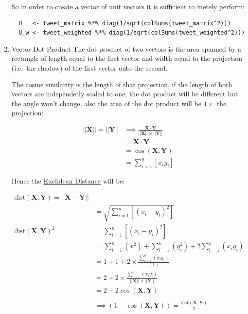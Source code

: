 \documentclass[11pt]{article}
\begin{document}
\begin{enumerate}
So in order to create a vector of unit vectors it is sufficient to
merely perform:

\begin{verbatim}
  U   <- tweet_matrix %*% diag(1/sqrt(colSums(tweet_matrix^2)))
  U_w <- tweet_weighted %*% diag(1/sqrt(colSums(tweet_weighted^2)))
\end{verbatim}

\item Vector Dot Product
\label{sec:org70ac74d}
The dot product of two vectors is the area spanned by a rectangle of
length equal to the first vector and width equal to the projection
(i.e. the shadow) of the first vector onto the second.

The cosine similarity is the length of that projection, if the length of
both vectors are independetly scaled to one, the dot product will be
different but the angle won't change, also the area of the dot product
will be \(1 \times\) the projection:

$$\begin{aligned}
    \left| \left| \mathbf{X} \right| \right| = \left|  \left| \mathbf{Y} \right| \right|  &\implies   \frac{\mathbf{\mathbf{X}\cdot  \mathbf{Y}}}{\left| \left| \mathbf{X} \right| \right|\times \left| \left| \mathbf{Y} \right| \right|}\\
    &= \mathbf{X}\cdot  \mathbf{Y} \\
    &= \cos\left( \mathbf{X}, \mathbf{Y} \right)\\
    &= \sum^{n}_{i= 1}   \left[ x_i y_i \right]
\end{aligned}$$

Hence the \href{https://en.wikipedia.org/wiki/Euclidean\_distance}{Euclidean
Distance} will be:

$$\begin{aligned}
\mathrm{dist}\left( \mathbf{X}, \mathbf{Y} \right)= \left| \left| \mathbf{X}-\mathbf{Y} \right| \right| \\
&= \sqrt{\sum^{n}_{i= 1}   \left[ \left( x_i-y_i \right)^2 \right] } \\
\mathrm{dist}\left( \mathbf{X}, \mathbf{Y} \right)^2&= \sum^{n}_{i= 1}  \left[ \left( x_i-y_i \right)^2 \right] \\
&= \sum^{n}_{i= 1}   \left( x^2 \right)+  \sum^{n}_{i= 1}   \left( y_i^2 \right)+ 2 \sum^{n}_{i= 1}   \left( x_iy_i \right) \\
&= 1+ 1 +  2 \times  \frac{\sum^{n}_{i= 1}   \left( x_iy_i \right)}{\left( 1 \right) }\\
&= 2+ 2\times \frac{\sum^{n}_{i= 1}   \left( x_iy_i \right)}{\left| \left| \mathbf{X} \right| \right|\times \left| \left| \mathbf{Y} \right| \right|}\\
&= 2+ 2 \cos\left( \mathbf{X}, \mathbf{Y} \right)\\
\ \\
& \implies  \left( 1- \cos\left( \mathbf{X}, \mathbf{Y} \right) \right) = \frac{\mathrm{dist}\left( \mathbf{X}, \mathbf{Y} \right)}{2}
\end{aligned}$$


\end{enumerate}
\end{document}
